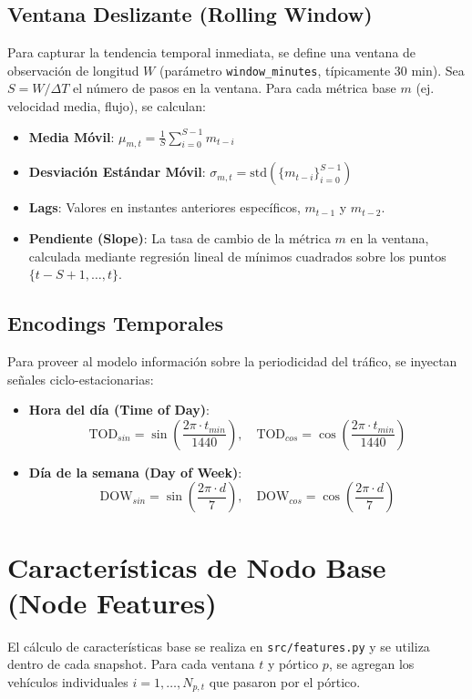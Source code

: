 \documentclass{article}
\begin{document}
\subsection{Ventana Deslizante (Rolling Window)}
Para capturar la tendencia temporal inmediata, se define una ventana de observación de longitud $W$ (parámetro \texttt{window\_minutes}, típicamente 30 min). Sea $S = W/\Delta T$ el número de pasos en la ventana.
Para cada métrica base $m$ (ej. velocidad media, flujo), se calculan:
\begin{itemize}
    \item \textbf{Media Móvil}: $\mu_{m, t} = \frac{1}{S} \sum_{i=0}^{S-1} m_{t-i}$
    \item \textbf{Desviación Estándar Móvil}: $\sigma_{m, t} = \text{std}(\{m_{t-i}\}_{i=0}^{S-1})$
    \item \textbf{Lags}: Valores en instantes anteriores específicos, $m_{t-1}$ y $m_{t-2}$.
    \item \textbf{Pendiente (Slope)}: La tasa de cambio de la métrica $m$ en la ventana, calculada mediante regresión lineal de mínimos cuadrados sobre los puntos $\{t-S+1, \dots, t\}$.
\end{itemize}

\subsection{Encodings Temporales}
Para proveer al modelo información sobre la periodicidad del tráfico, se inyectan señales ciclo-estacionarias:
\begin{itemize}
    \item \textbf{Hora del día (Time of Day)}:
    \[ \text{TOD}_{sin} = \sin\left(\frac{2\pi \cdot t_{min}}{1440}\right), \quad \text{TOD}_{cos} = \cos\left(\frac{2\pi \cdot t_{min}}{1440}\right) \]
    \item \textbf{Día de la semana (Day of Week)}:
    \[ \text{DOW}_{sin} = \sin\left(\frac{2\pi \cdot d}{7}\right), \quad \text{DOW}_{cos} = \cos\left(\frac{2\pi \cdot d}{7}\right) \]
\end{itemize}

\section{Características de Nodo Base (Node Features)}
\label{sec:node_features}
El cálculo de características base se realiza en \texttt{src/features.py} y se utiliza dentro de cada snapshot. Para cada ventana $t$ y pórtico $p$, se agregan los vehículos individuales $i = 1, \dots, N_{p,t}$ que pasaron por el pórtico.
\end{document}
